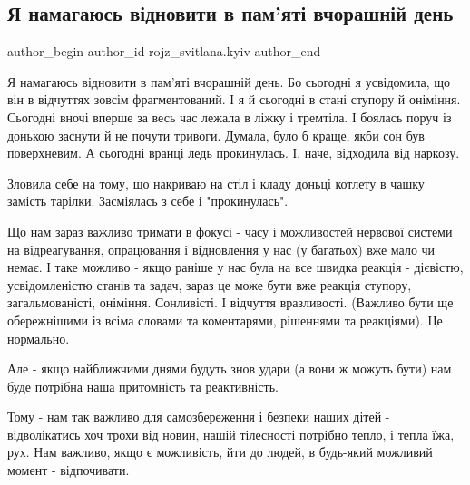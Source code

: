  
 
 
 
 

\subsection{Я намагаюсь відновити в пам'яті вчорашній день}
\label{sec:15_01_2023.fb.rojz_svitlana.kyiv.1.ya_namagayus_v_dnovi}

\ifcmt
 author_begin
   author_id rojz_svitlana.kyiv
 author_end
\fi

Я намагаюсь відновити в пам'яті вчорашній день. Бо сьогодні я усвідомила, що
він в відчуттях зовсім фрагментований. І я й сьогодні в стані ступору й
оніміння. Сьогодні вночі вперше за весь час лежала в ліжку і тремтіла. І
боялась поруч із донькою заснути й не почути тривоги. Думала, було б краще,
якби сон був поверхневим. А сьогодні вранці ледь прокинулась. І, наче,
відходила від наркозу.

Зловила себе на тому, що накриваю на стіл і кладу доньці котлету в чашку
замість тарілки. Засміялась з себе і "прокинулась". 🙂

Що нам зараз важливо тримати в фокусі - часу і можливостей нервової системи на
відреагування, опрацювання і відновлення у нас (у багатьох) вже мало чи немає.
І таке можливо - якщо раніше у нас була на все швидка реакція - дієвістю,
усвідомленістю станів та задач, зараз це може бути вже реакція ступору,
загальмованісті, оніміння. Сонливісті. І відчуття вразливості. (Важливо бути ще
обережнішими із всіма словами та коментарями, рішеннями та реакціями). Це
нормально. 

Але - якщо найближчими днями будуть знов удари (а вони ж можуть бути) нам буде
потрібна наша притомність та реактивність. 

Тому - нам так важливо для самозбереження і безпеки наших дітей - відволікатись
хоч трохи від новин, нашій тілесності потрібно тепло, і тепла їжа, рух. Нам
важливо, якщо є можливість, йти до людей, в будь-який  можливий момент -
відпочивати.

